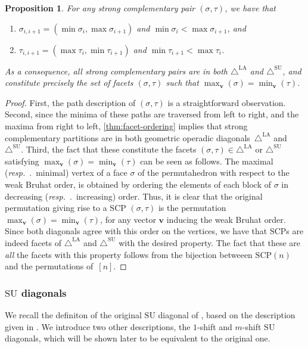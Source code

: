 \documentclass{amsart}
\newtheorem{proposition}[theorem]{Proposition}
\theoremstyle{definition}
\renewcommand{\b}[1]{{\boldsymbol{#1}}} %
\newcommand{\resp}{\textit{resp.}~} %
\renewcommand{\b}[1]{\boldsymbol{#1}} %
\newcommand{\SU}{\mathrm{SU}}
\newcommand{\SUD}{\triangle^{\mathrm{SU}}}
\newcommand{\LAD}{\triangle^{\mathrm{LA}}}
\newcommand{\SCP}{\mathrm{SCP}}
\begin{document}
\begin{proposition} 
\label{lem:SCP-path-desc}
For any strong complementary pair $(\sigma,\tau)$, we have that
\begin{enumerate}
    \item $ \sigma_{i,i+1} = ( \min \sigma_i, \max \sigma_{i+1} )$ and $\min \sigma_i< \max \sigma_{i+1}$, and
    \item $  \tau_{i,i+1} =  ( \max \tau_i, \min \tau_{i+1} )$ and $\min \tau_{i+1}< \max \tau_{i}$.
\end{enumerate}
As a consequence, all strong complementary pairs are in both $\LAD$ and $\SUD$, and constitute precisely the set of facets $(\sigma,\tau)$ such that $\max_{\b{v}}(\sigma) = \min_{\b{v}}(\tau)$.
\end{proposition}
\begin{proof}
First, the path description of $(\sigma,\tau)$ is a straightforward observation. 
Second, since the minima of these paths are traversed from left to right, and the maxima from right to left, \cref{thm:facet-ordering} implies that strong complementary partitions are in both geometric operadic diagonals~$\LAD$ and~$\SUD$.
Third, the fact that these constitute the facets $(\sigma,\tau) \in \LAD$ or $\SUD$ satisfying $\max_{\b{v}}(\sigma) = \min_{\b{v}}(\tau)$ can be seen as follows.
The maximal (\resp.~minimal) vertex of a face $\sigma$ of the permutahedron with respect to the weak Bruhat order, is obtained by ordering the elements of each block of $\sigma$ in decreasing (\resp.~increasing) order. 
Thus, it is clear that the original permutation giving rise to a $\SCP$ $(\sigma,\tau)$ is the permutation $\max_{\b{v}}(\sigma)=\min_{\b{v}}(\tau)$, for any vector $\b{v}$ inducing the weak Bruhat order.
Since both diagonals agree with this order on the vertices, we have that $\SCP$s are indeed facets of $\LAD$ and $\SUD$ with the desired property. 
The fact that these are \emph{all} the facets with this property follows from the bijection betweeen $\SCP(n)$ and the permutations of~$[n]$.
\end{proof}



\subsubsection{$\SU$ diagonals}

We recall the definiton of the original $\SU$ diagonal of \cite{SaneblidzeUmble04}, based on the description given in \cite{saneblidzeComparingDiagonalsAssociahedra2022}.
We introduce two other descriptions, the $1$-shift and $m$-shift $\SU$ diagonals, which will be shown later to be equivalent to the original one.
\end{document}
